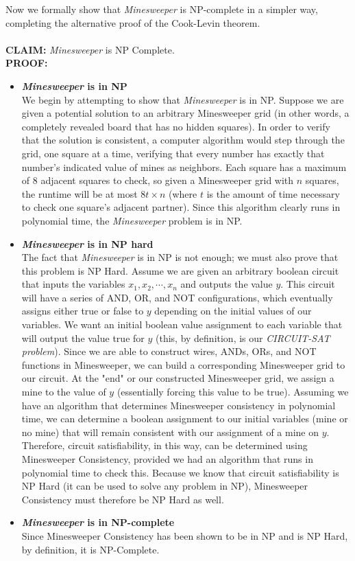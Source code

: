 \documentclass{article}
\begin{document}
Now we formally show that \textit{Minesweeper} is NP-complete in a simpler way, completing the alternative proof of the Cook-Levin theorem. \\
\\
\textbf{CLAIM:} \textit{Minesweeper} is NP Complete.
\\
\textbf{PROOF:}
\begin{itemize}
  \item \textbf{\textit{Minesweeper} is in NP} \\
  We begin by attempting to show that \textit{Minesweeper} is in NP. Suppose we are given a potential solution to an arbitrary Minesweeper grid (in other words, a completely revealed board that has no hidden squares). In order to verify that the solution is consistent, a computer algorithm would step through the grid, one square at a time, verifying that every number has exactly that number’s indicated value of mines as neighbors. Each square has a maximum of 8 adjacent squares to check, so given a Minesweeper grid with $n$ squares, the runtime will be at most $8t\times n$ (where $t$ is the amount of time necessary to check one square’s adjacent partner). Since this algorithm clearly runs in polynomial time, the \textit{Minesweeper} problem is in NP.
  \item \textbf{\textit{Minesweeper} is in NP hard} \\
  The fact that \textit{Minesweeper} is in NP is not enough; we must also prove that this problem is NP Hard. Assume we are given an arbitrary boolean circuit that inputs the variables $x_1,x_2,\cdots,x_n$ and outputs the value $y$. This circuit will have a series of AND, OR, and NOT configurations, which eventually assigns either true or false to $y$ depending on the initial values of our variables. We want an initial boolean value assignment to each variable that will output the value true for $y$ (this, by definition, is our \textit{CIRCUIT-SAT problem}). Since we are able to construct wires, ANDs, ORs, and NOT functions in Minesweeper, we can build a corresponding Minesweeper grid to our circuit. At the "end" or our constructed Minesweeper grid, we assign a mine to the value of $y$ (essentially forcing this value to be true). Assuming we have an algorithm that determines Minesweeper consistency in polynomial time, we can determine a boolean assignment to our initial variables (mine or no mine) that will remain consistent with our assignment of a mine on $y$. Therefore, circuit satisfiability, in this way, can be determined using Minesweeper Consistency, provided we had an algorithm that runs in polynomial time to check this. Because we know that circuit satisfiability is NP Hard (it can be used to solve any problem in NP), Minesweeper Consistency must therefore be NP Hard as well.
  \item \textbf{\textit{Minesweeper} is in NP-complete} \\
  Since Minesweeper Consistency has been shown to be in NP and is NP Hard, by definition, it is NP-Complete.
\end{itemize}
\end{document}
